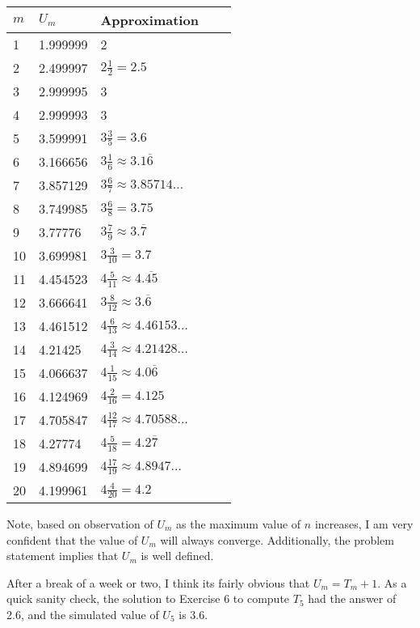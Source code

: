 \documentclass{report}
\begin{document}
			\begin{table}[h]
				\begin{tabular}{lllll}
					$m$ & $U_m$ & Approximation \\
					\hline
					1 & 1.999999 & 2\\
					2 & 2.499997 & $2\frac{1}{2} = 2.5$ \\
					3 & 2.999995 & 3 \\
					4 & 2.999993 & 3 \\
					5 & 3.599991 & $3\frac{3}{5} = 3.6$ \\
					6 & 3.166656 & $3 \frac{1}{6} \approx 3.1\overline{6}$ \\
					7 & 3.857129 & $3 \frac{6}{7} \approx 3.85714\dots$ \\
					8 & 3.749985 & $3 \frac{6}{8} = 3.75$ \\
					9 & 3.77776 & $3 \frac{7}{9} \approx 3.\overline{7}$ \\
					10 & 3.699981 & $3 \frac{3}{10} = 3.7$ \\
					11 & 4.454523 & $4 \frac{5}{11} \approx 4.\overline{45}$ \\
					12 & 3.666641 & $3 \frac{8}{12} \approx 3.\overline{6}$ \\
					13 & 4.461512 & $4 \frac{6}{13} \approx 4.46153\dots$ \\
					14 & 4.21425 & $4 \frac{3}{14} \approx 4.21428\dots$ \\
					15 & 4.066637 & $4 \frac{1}{15} \approx 4.0\overline{6}$ \\
					16 & 4.124969 & $4 \frac{2}{16} = 4.125$ \\
					17 & 4.705847 & $4 \frac{12}{17} \approx 4.70588\dots$ \\
					18 & 4.27774 & $4 \frac{5}{18} = 4.2\overline{7}$ \\
					19 & 4.894699 & $4 \frac{17}{19} \approx 4.8947\dots$ \\
					20 & 4.199961 & $4 \frac{4}{20} = 4.2$ \\
				\end{tabular}
			\end{table}
			
			Note, based on observation of $U_m$ as the maximum value of $n$ increases, I am very confident that the value of $U_m$ will always converge. Additionally, the problem statement implies that $U_m$ is well defined.
			
			After a break of a week or two, I think its fairly obvious that $U_m = T_m + 1$. As a quick sanity check, the solution to Exercise 6 to compute $T_5$ had the answer of 2.6, and the simulated value of $U_5$ is 3.6.
			
\end{document}
